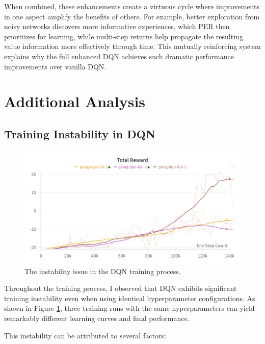 \documentclass[a4paper]{article}
\begin{document}
When combined, these enhancements create a virtuous cycle where improvements in one aspect amplify the benefits of others. For example, better exploration from noisy networks discovers more informative experiences, which PER then prioritizes for learning, while multi-step returns help propagate the resulting value information more effectively through time. This mutually reinforcing system explains why the full enhanced DQN achieves such dramatic performance improvements over vanilla DQN.

\section{Additional Analysis}

\subsection{Training Instability in DQN}

\begin{figure}[H]
\centering
\includegraphics[width=0.5\linewidth]{figures/unstable}
\caption{The instability issue in the DQN training process.}
\label{fig:unstable}
\end{figure}


Throughout the training process, I observed that DQN exhibits significant training instability even when using identical hyperparameter configurations. As shown in Figure \ref{fig:unstable}, three training runs with the same hyperparameters can yield remarkably different learning curves and final performance.

This instability can be attributed to several factors:
\end{document}

